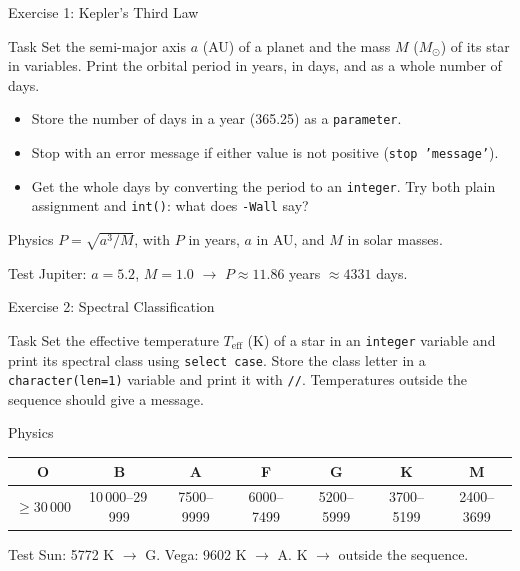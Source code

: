 \begin{frame}{Exercise 1: Kepler's Third Law}
  \begin{block}{Task}
  Set the semi-major axis $a$ (AU) of a planet and the mass $M$ ($M_\odot$) of its star in variables. Print the orbital period in years, in days, and as a whole number of days.
  \begin{itemize}
    \item Store the number of days in a year (365.25) as a \texttt{parameter}.
    \item Stop with an error message if either value is not positive (\texttt{stop 'message'}).
    \item Get the whole days by converting the period to an \texttt{integer}. Try both plain assignment and \texttt{int()}: what does \texttt{-Wall} say?
  \end{itemize}
  \end{block}
  \begin{block}{Physics}
  $P = \sqrt{a^3 / M}$, with $P$ in years, $a$ in AU, and $M$ in solar masses.
  \end{block}
  \begin{block}{Test}
  Jupiter: $a = 5.2$, $M = 1.0$ $\to$ $P \approx 11.86$ years $\approx 4331$ days.
  \end{block}
\end{frame}

\begin{frame}{Exercise 2: Spectral Classification}
  \begin{block}{Task}
  Set the effective temperature $T_\mathrm{eff}$ (K) of a star in an \texttt{integer} variable and print its spectral class using \texttt{select case}. Store the class letter in a \texttt{character(len=1)} variable and print it with \texttt{//}. Temperatures outside the sequence should give a message.
  \end{block}
  \begin{block}{Physics}
  \centering\setlength{\tabcolsep}{4pt}
  \begin{tabular}{ccccccc}
    O & B & A & F & G & K & M \\ \hline
    $\geq 30\,000$ & 10\,000--29\,999 & 7500--9999 & 6000--7499 & 5200--5999 & 3700--5199 & 2400--3699 \\
  \end{tabular}
  \end{block}
  \begin{block}{Test}
  Sun: 5772 K $\to$ G. \quad Vega: 9602 K $\to$ A.  K $\to$ outside the sequence.
  \end{block}
\end{frame}

